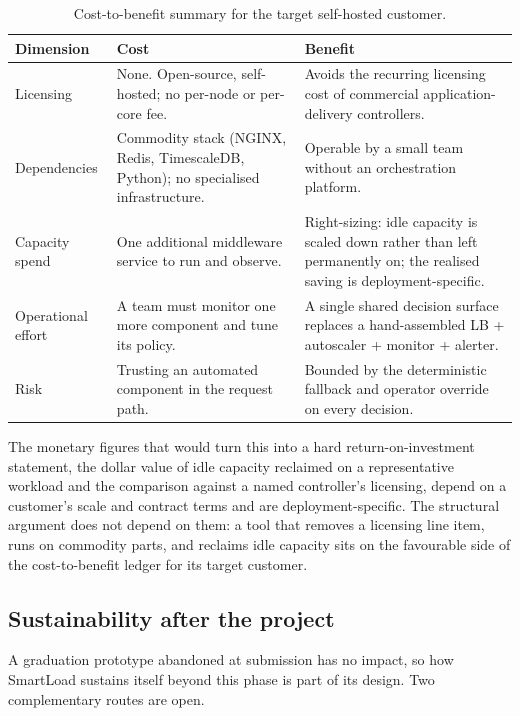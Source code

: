 \begin{table}[H]
  \centering
  \caption[Cost-to-benefit summary for the self-hosted customer]{Cost-to-benefit summary for the target self-hosted customer.}
  \label{tab:disc:cost_benefit}
  \small
  \begin{tabular}{@{}p{3.4cm}p{5.0cm}p{4.6cm}@{}}
    \toprule
    \headrow
    \textbf{Dimension} & \textbf{Cost} & \textbf{Benefit} \\
    \midrule
    Licensing
      & None. Open-source, self-hosted; no per-node or per-core fee.
      & Avoids the recurring licensing cost of commercial application-delivery controllers. \\
    Dependencies
      & Commodity stack (NGINX, Redis, TimescaleDB, Python); no specialised infrastructure.
      & Operable by a small team without an orchestration platform. \\
    Capacity spend
      & One additional middleware service to run and observe.
      & Right-sizing: idle capacity is scaled down rather than left permanently on; the realised saving is deployment-specific. \\
    Operational effort
      & A team must monitor one more component and tune its policy.
      & A single shared decision surface replaces a hand-assembled LB + autoscaler + monitor + alerter. \\
    Risk
      & Trusting an automated component in the request path.
      & Bounded by the deterministic fallback and operator override on every decision. \\
    \bottomrule
  \end{tabular}
\end{table}

The monetary figures that would turn this into a hard return-on-investment statement,
the dollar value of idle capacity reclaimed on a representative workload and the
comparison against a named controller's licensing, depend on a customer's scale and
contract terms and are deployment-specific. The structural argument does not depend on
them: a tool that removes a licensing line item, runs on commodity parts, and reclaims
idle capacity sits on the favourable side of the cost-to-benefit ledger for its target
customer.

\subsection{Sustainability after the project}
\label{disc:sustainability}

A graduation prototype abandoned at submission has no impact, so how SmartLoad sustains
itself beyond this phase is part of its design. Two complementary routes are open.

